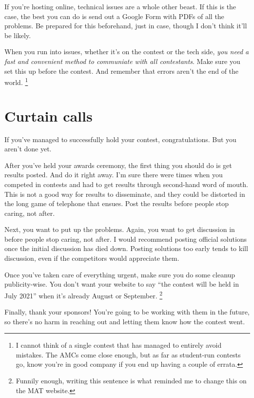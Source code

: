 \documentclass[points=false]{bounce}
\begin{document}
If you're hosting online,
technical issues are a whole other beast.
If this is the case, the best you can do
is send out a Google Form with PDFs of all the problems.
Be prepared for this beforehand, just in case,
though I don't think it'll be likely.

When you run into issues,
whether it's on the contest
or the tech side,
\emph{you need a fast and convenient method to communiate
with all contestants}.
Make sure you set this up before the contest.
And remember that errors aren't the end
of the world.
\footnote{I cannot think of a single contest
that has managed to entirely avoid mistakes.
The AMCs come close enough,
but as far as student-run contests go,
know you're in good company
if you end up having a couple of errata.}

\section{Curtain calls}

If you've managed to successfully hold your contest, congratulations.
But you aren't done yet.

After you've held your awards ceremony,
the first thing you should do is get results posted.
And do it right away.
I'm sure there were times when you competed in contests
and had to get results through second-hand word of mouth.
This is not a good way for results to disseminate,
and they could be distorted in the long
game of telephone that ensues.
Post the results before people stop caring,
not after.

Next, you want to put up the problems.
Again, you want to get discussion in before
people stop caring, not after.
I would recommend posting official solutions
once the initial discussion has died down.
Posting solutions too early tends to kill discussion,
even if the competitors would appreciate them.

Once you've taken care of everything urgent,
make sure you do some cleanup publicity-wise.
You don't want your website to say
``the contest will be held in July 2021''
when it's already August or September.
\footnote{Funnily enough,
writing this sentence is what reminded me
to change this on the MAT website.}

Finally, thank your sponsors!
You're going to be working with them
in the future,
so there's no harm in reaching out
and letting them know how the contest went.
\end{document}
